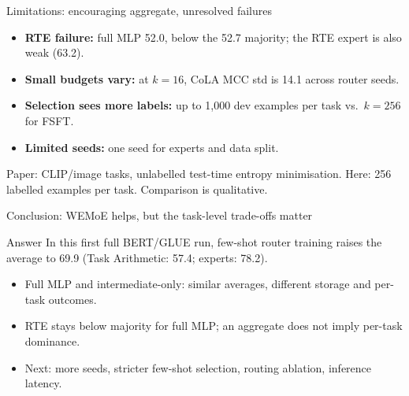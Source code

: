 \documentclass[aspectratio=169,10pt]{beamer}
\begin{document}
\begin{frame}{Limitations: encouraging aggregate, unresolved failures}
  \begin{itemize}
    \item \textbf{RTE failure:} full MLP 52.0, below the 52.7 majority; the RTE expert is also weak (63.2).
    \item \textbf{Small budgets vary:} at $k=16$, CoLA MCC std is 14.1 across router seeds.
    \item \textbf{Selection sees more labels:} up to 1,000 dev examples per task vs.\ $k=256$ for FSFT.
    \item \textbf{Limited seeds:} one seed for experts and data split.
  \end{itemize}
  \vfill
  \centering
  \small Paper: CLIP/image tasks, unlabelled test-time entropy minimisation. Here: 256 labelled examples per task. Comparison is qualitative.\cite{tang2024wemoe}
\end{frame}

\begin{frame}{Conclusion: WEMoE helps, but the task-level trade-offs matter}
  \begin{block}{Answer}
    In this first full BERT/GLUE run, few-shot router training raises the average to 69.9 (Task Arithmetic: 57.4; experts: 78.2).
  \end{block}
  \begin{itemize}
    \item Full MLP and intermediate-only: similar averages, different storage and per-task outcomes.
    \item RTE stays below majority for full MLP; an aggregate does not imply per-task dominance.
    \item Next: more seeds, stricter few-shot selection, routing ablation, inference latency.
  \end{itemize}
\end{frame}
\end{document}
